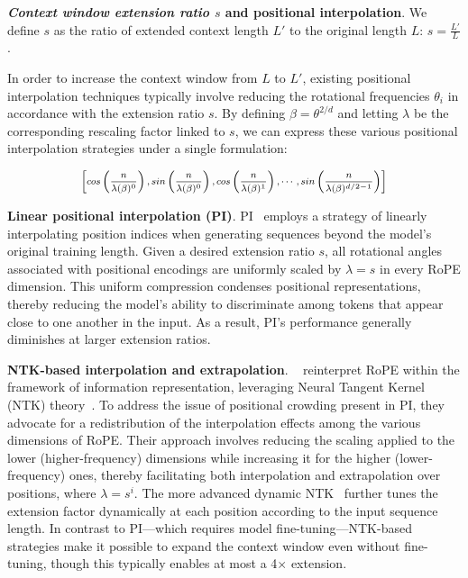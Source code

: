 \textbf{\emph{Context window extension ratio $s$} and positional interpolation}. We define $s$ as  the ratio of extended context length $L'$ to the original length $L$: $s=\frac{L'}{L}$. 

In order to increase the context window from $L$ to $L'$, existing positional interpolation techniques typically involve reducing the rotational frequencies $\theta_i$ in accordance with the extension ratio $s$. By defining $\beta = \theta^{2/d}$ and letting $\lambda$ be the corresponding rescaling factor linked to $s$, we can express these various positional interpolation strategies under a single formulation:

\begin{equation}	
	\fontsize{7.5}{7.5} \selectfont
	\label{eq:unified_rope}
	\begin{aligned}
		\left[cos\left(\frac{n}{\lambda(\beta)^0}\right), sin \left(\frac{n}{\lambda(\beta)^0}\right), cos\left(\frac{n}{\lambda(\beta)^1}\right), \cdots,  sin \left(\frac{n}{\lambda(\beta)^{d/2-1}}\right) \right]   
	\end{aligned}
\end{equation}

\textbf{Linear positional interpolation (PI)}. PI~\cite{pi} employs a strategy of linearly interpolating position indices when generating sequences beyond the model’s original training length. Given a desired extension ratio $s$, all rotational angles associated with positional encodings are uniformly scaled by $\lambda = s$ in every RoPE dimension. This uniform compression condenses positional representations, thereby reducing the model's ability to discriminate among tokens that appear close to one another in the input. As a result, PI’s performance generally diminishes at larger extension ratios.

\textbf{NTK-based interpolation and extrapolation}. ~\cite{ntk,dynamicntk} reinterpret RoPE within the framework of information representation, leveraging Neural Tangent Kernel (NTK) theory~\cite{jacot2018neural,tancik2020fourier}. To address the issue of positional crowding present in PI, they advocate for a redistribution of the interpolation effects among the various dimensions of RoPE. Their approach involves reducing the scaling applied to the lower (higher-frequency) dimensions while increasing it for the higher (lower-frequency) ones, thereby facilitating both interpolation and extrapolation over positions, where $\lambda=s^{i}$. The more advanced dynamic NTK~\cite{dynamicntk} further tunes the extension factor dynamically at each position according to the input sequence length. In contrast to PI—which requires model fine-tuning—NTK-based strategies make it possible to expand the context window even without fine-tuning, though this typically enables at most a 4$\times$ extension.

